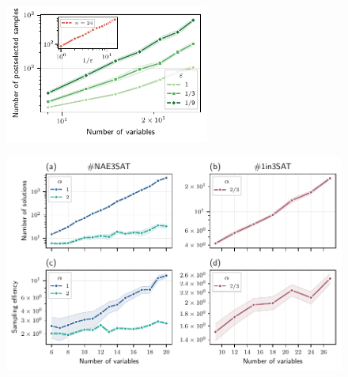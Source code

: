 \begin{figure}[h!]
    \centering
    \includegraphics[width=0.6\textwidth]{figures/1in3sat-scaling.pdf}
    \caption{}
    \label{fig:1in3sat-scaling}
\end{figure}



\begin{figure}[h!]
    \centering
    \includegraphics[width=1\textwidth]{figures/sampling-efficiency.pdf}
    \caption{}
    \label{fig:sampling-efficiency}
\end{figure}


